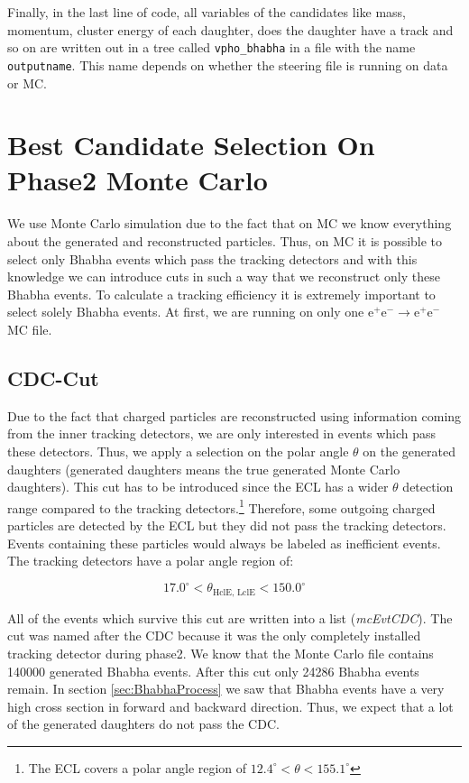 \documentclass[a4paper,11pt,twosided,final,german,openbib,pdftex,listof=totoc,bibliography=totoc]{scrbook}
\begin{document}
Finally, in the last line of code, all variables of the candidates like mass, momentum, cluster energy of each daughter, does the daughter have a track and so on are written out in a tree called \texttt{vpho\_bhabha} in a file with the name \texttt{outputname}. This name depends on whether the steering file is running on data or MC.


\section{Best Candidate Selection On Phase2 Monte Carlo}
\label{sec:SelectingBhabhaMC}

We use Monte Carlo simulation due to the fact that on MC we know everything about the generated and reconstructed particles. Thus, on MC it is possible to select only Bhabha events which pass the tracking detectors and with this knowledge we can introduce cuts in such a way that we reconstruct only these Bhabha events. To calculate a tracking efficiency it is extremely important to select solely Bhabha events. At first, we are running on only one $\textrm{e}^+ \textrm{e}^- \rightarrow \textrm{e}^+ \textrm{e}^-$ MC file.


\subsection{CDC-Cut}

Due to the fact that charged particles are reconstructed using information coming from the inner tracking detectors, we are only interested in events which pass these detectors. Thus, we apply a selection on the polar angle $\theta$ on the generated daughters (generated daughters means the true generated Monte Carlo daughters). This cut has to be introduced since the ECL has a wider $\theta$ detection range compared to the tracking detectors.\footnote{The ECL covers a polar angle region of $12.4^{\circ} < \theta < 155.1^{\circ}$} Therefore, some outgoing charged particles are detected by the ECL but they did not pass the tracking detectors. Events containing these particles would always be labeled as inefficient events.
The tracking detectors have a polar angle region of:

\begin{equation}
	17.0^\circ < \theta_{\textrm{HclE, LclE}} < 150.0^\circ
\end{equation}

All of the events which survive this cut are written into a list (\textit{mcEvtCDC}). The cut was named after the CDC because it was the only completely installed tracking detector during phase2. We know that the Monte Carlo file contains 140000 generated Bhabha events. After this cut only 24286 Bhabha events remain.
In section \ref{sec:BhabhaProcess} we saw that Bhabha events have a very high cross section in forward and backward  direction. Thus, we expect that a lot of the generated daughters do not pass the CDC. 
\newline
\end{document}
